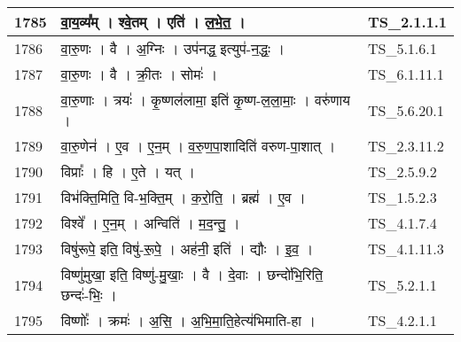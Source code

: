 \documentclass[17pt]{extarticle}
\begin{document}
\begin{longtable}{||p{0.4in}||p{4.9in}||p{0.9in}||}
    \hline
        
    1785 & वा॒य॒व्य᳚म्   ।   श्वे॒तम्   ।   एति॑   ।   ल॒भे॒त॒   ।    & TS\_2.1.1.1       \\
    
    \hline
        
    1786 & वा॒रु॒णः   ।   वै   ।   अ॒ग्निः   ।   उप॑नद्ध॒ इत्युप॑{-}न॒द्धः॒   ।    & TS\_5.1.6.1       \\
    
    \hline
        
    1787 & वा॒रु॒णः   ।   वै   ।   क्री॒तः   ।   सोमः॑   ।    & TS\_6.1.11.1       \\
    
    \hline
        
    1788 & वा॒रु॒णाः   ।   त्रयः॑   ।   कृ॒ष्णल॑लामा॒ इति॑ कृ॒ष्ण{-}ल॒ला॒माः॒   ।   वरु॑णाय   ।    & TS\_5.6.20.1       \\
    
    \hline
        
    1789 & वा॒रु॒णेन॑   ।   ए॒व   ।   ए॒न॒म्   ।   व॒रु॒ण॒पा॒शादिति॑ वरुण{-}पा॒शात्   ।    & TS\_2.3.11.2       \\
    
    \hline
        
    1790 & विप्राः᳚   ।   हि   ।   ए॒ते   ।   यत्   ।    & TS\_2.5.9.2       \\
    
    \hline
        
    1791 & विभ॑क्ति॒मिति॒ वि{-}भ॒क्ति॒म्   ।   क॒रो॒ति॒   ।   ब्रह्म॑   ।   ए॒व   ।    & TS\_1.5.2.3       \\
    
    \hline
        
    1792 & विश्वे᳚   ।   ए॒न॒म्   ।   अन्विति॑   ।   म॒द॒न्तु॒   ।    & TS\_4.1.7.4       \\
    
    \hline
        
    1793 & विषु॑रूपे॒ इति॒ विषु॑{-}रू॒पे॒   ।   अह॑नी॒ इति॑   ।   द्यौः   ।   इ॒व॒   ।    & TS\_4.1.11.3       \\
    
    \hline
        
    1794 & विष्णु॑मुखा॒ इति॒ विष्णु॑{-}मु॒खाः॒   ।   वै   ।   दे॒वाः   ।   छन्दो॑भि॒रिति॒ छन्दः॑{-}भिः॒   ।    & TS\_5.2.1.1       \\
    
    \hline
        
    1795 & विष्णोः᳚   ।   क्रमः॑   ।   अ॒सि॒   ।   अ॒भि॒मा॒ति॒हेत्य॑भिमाति{-}हा   ।    & TS\_4.2.1.1       \\
    

\end{longtable}
\end{document}
